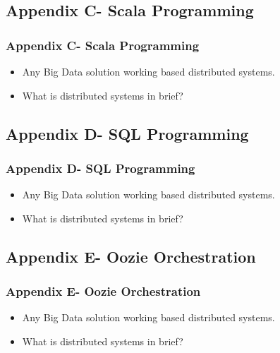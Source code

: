 
\subsection{Appendix C- Scala Programming}  
\begin{frame}
\frametitle{Appendix C- Scala Programming}
\begin{itemize}[<+->]
	\item Any Big Data solution working based distributed systems.
	\item What is distributed systems in brief?
\end{itemize}
\end{frame}


\subsection{Appendix D- SQL Programming}
\begin{frame}
\frametitle{Appendix D- SQL Programming}
\begin{itemize}[<+->]
	\item Any Big Data solution working based distributed systems.
	\item What is distributed systems in brief?
\end{itemize}
\end{frame}


\subsection{Appendix E- Oozie Orchestration}
\begin{frame}
\frametitle{Appendix E- Oozie Orchestration}
\begin{itemize}[<+->]
	\item Any Big Data solution working based distributed systems.
	\item What is distributed systems in brief?
\end{itemize}
\end{frame}

